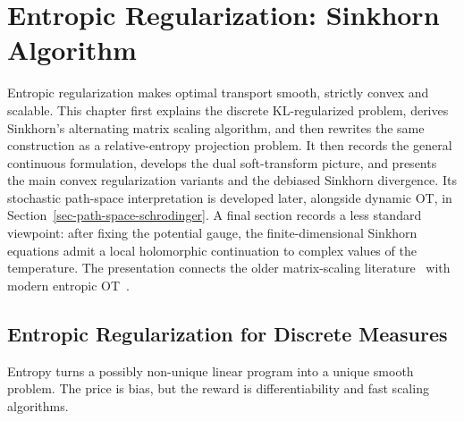 

\chapter{Entropic Regularization: Sinkhorn Algorithm}
\label{sec-sinkhorn}

Entropic regularization makes optimal transport smooth, strictly convex and scalable. This chapter first explains the discrete KL-regularized problem, derives Sinkhorn's alternating matrix scaling algorithm, and then rewrites the same construction as a relative-entropy projection problem. It then records the general continuous formulation, develops the dual soft-transform picture, and presents the main convex regularization variants and the debiased Sinkhorn divergence. Its stochastic path-space interpretation is developed later, alongside dynamic OT, in Section~\ref{sec-path-space-schrodinger}. A final section records a less standard viewpoint: after fixing the potential gauge, the finite-dimensional Sinkhorn equations admit a local holomorphic continuation to complex values of the temperature. The presentation connects the older matrix-scaling literature~\cite{Sinkhorn64,SinkhornKnopp67,Sinkhorn67} with modern entropic OT~\cite{CuturiSinkhorn,peyre2019computational}.

\section{Entropic Regularization for Discrete Measures}
\label{sec-entropic-discrete}

Entropy turns a possibly non-unique linear program into a unique smooth problem. The price is bias, but the reward is differentiability and fast scaling algorithms.

